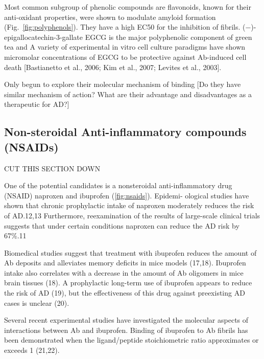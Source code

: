 Most common subgroup of phenolic compounds are flavonoids, known for their anti-oxidant properties, were shown to modulate amyloid formation (Fig.~\ref{fig:polyphenols}). They have a high EC50 for the inhibition of fibrils.   (−)-epigallocatechin-3-gallate EGCG is the major polyphenolic component of green tea and  A variety of experimental in vitro cell culture paradigms have shown micromolar concentrations of EGCG to be protective against Ab-induced cell death [Bastianetto et al., 2006; Kim et al., 2007; Levites et al., 2003].

Only begun to explore their molecular mechanism of binding [Do they have similar mechanism of action? What are their advantage and disadvantages as a therapeutic for AD?]


\subsection{Non-steroidal Anti-inflammatory compounds (NSAIDs)}

CUT THIS SECTION DOWN

One of the potential candidates is a nonsteroidal anti-inflammatory drug (NSAID) naproxen and ibuprofen (\ref{fig:nsaids}).\cite{XXX} Epidemi- ological studies have shown that chronic prophylactic intake of naproxen moderately reduces the risk of AD.12,13 Furthermore, reexamination of the results of large-scale clinical trials suggests that under certain conditions naproxen can reduce the AD risk by 67\%.11

Biomedical studies suggest that treatment with ibuprofen reduces the amount of Ab deposits and alleviates memory deficits in mice models (17,18). Ibuprofen intake also correlates with a decrease in the amount of Ab oligomers in mice brain tissues (18). A prophylactic long-term use of ibuprofen appears to reduce the risk of AD (19), but the effectiveness of this drug against preexisting AD cases is unclear (20). 

Several recent experimental studies have investigated the molecular aspects of interactions between Ab and ibuprofen. Binding of ibuprofen to Ab fibrils has been demonstrated when the ligand/peptide stoichiometric ratio approximates or exceeds 1 (21,22). 

